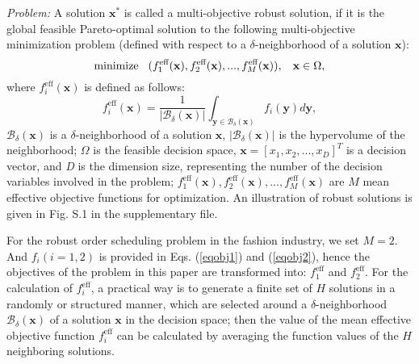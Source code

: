 \documentclass[journal]{IEEEtran}
\theoremstyle{definition}
\begin{document}
\emph{Problem:} A solution $\textbf{x}^\ast$ is called a multi-objective robust solution, if it is the global feasible Pareto-optimal solution to the following multi-objective minimization problem (defined with respect to a $\delta$-neighborhood of a solution $\textbf{x}$):
\begin{equation}
\textrm{minimize}\hspace{0.3cm} (f_1^{\textrm{eff}}(\textbf{x}), f_2^{\textrm{eff}}(\textbf{x}),..., f_M^{\textrm{eff}}(\textbf{x})), \hspace{0.3cm} \textbf{x}\in\Omega,
\label{eqproblem}
\end{equation}
where $f_i^{\textrm{eff}}(\textbf{x})$ is defined as follows:
\begin{equation}
f_i^{\textrm{eff}}(\textbf{x})=\frac{1}{|\mathcal{B}_\delta(\textbf{x})|}\int_{\textbf{y}\in\mathcal{B}_\delta(\textbf{x})}f_i(\textbf{y})d\textbf{y},
\label{eqprofi}
\end{equation}
$\mathcal{B}_\delta(\textbf{x})$ is a $\delta$-neighborhood of a solution $\textbf{x}$, $|\mathcal{B}_\delta(\textbf{x})|$ is the hypervolume of the neighborhood; $\Omega$ is the feasible decision space, $\textbf{x}=[x_1,x_2,...,x_D]^T$ is a decision vector, and \emph{D} is the dimension size, representing the number of the decision variables involved in the problem; $f_1^{\textrm{eff}}(\textbf{x}), f_2^{\textrm{eff}}(\textbf{x}),..., f_M^{\textrm{eff}}(\textbf{x})$ are $M$ mean effective objective functions for optimization. An illustration of robust solutions is given in Fig. S.1 in the supplementary file.

For the robust order scheduling problem in the fashion industry, we set $M=2$. And $f_i(i=1, 2)$ is provided in Eqs. (\ref{eqobj1}) and (\ref{eqobj2}), hence the objectives of the problem in this paper are transformed into: $f_1^{\textrm{eff}}$ and $f_2^{\textrm{eff}}$. For the calculation of $f_i^{\textrm{eff}}$, a practical way is to generate a finite set of $H$ solutions in a randomly or structured manner, which are selected around a $\delta$-neighborhood $\mathcal{B}_\delta(\textbf{x})$ of a solution $\textbf{x}$ in the decision space; then the value of the mean effective objective function $f_i^{\textrm{eff}}$ can be calculated by averaging the function values of the $H$ neighboring solutions.
\end{document}
